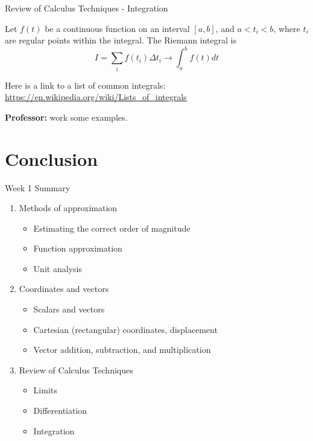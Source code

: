 \documentclass{beamer}
\begin{document}
\begin{frame}{Review of Calculus Techniques - Integration}
\begin{tcolorbox}[colback=white,colframe=gray,title=Integral of a Function]
Let $f(t)$ be a continuous function on an interval $[a,b]$, and $a<t_i<b$, where $t_i$ are regular points within the integral.  The Riemann integral is
\begin{equation}
I = \sum_i f(t_i) \Delta t_i \to \int_a^b f(t) dt
\end{equation}
\end{tcolorbox}
\begin{tcolorbox}[colback=white,colframe=gray,title=List of Common Derivatives]
Here is a link to a list of common integrals:
\url{https://en.wikipedia.org/wiki/Lists_of_integrals}
\end{tcolorbox}
\textbf{Professor:} work some examples.
\end{frame}

\section{Conclusion}

\begin{frame}{Week 1 Summary}
\begin{enumerate}
\item Methods of approximation
\begin{itemize}
\item \alert{Estimating} the correct order of magnitude
\item \alert{Function} approximation
\item \alert{Unit analysis}
\end{itemize}
\item Coordinates and vectors
\begin{itemize}
\item \alert{Scalars} and \alert{vectors}
\item \alert{Cartesian} (rectangular) coordinates, displacement
\item \alert{Vector} addition, subtraction, and multiplication
\end{itemize}
\item Review of Calculus Techniques
\begin{itemize}
\item Limits
\item Differentiation
\item Integration
\end{itemize}
\end{enumerate}
\end{frame}
\end{document}
